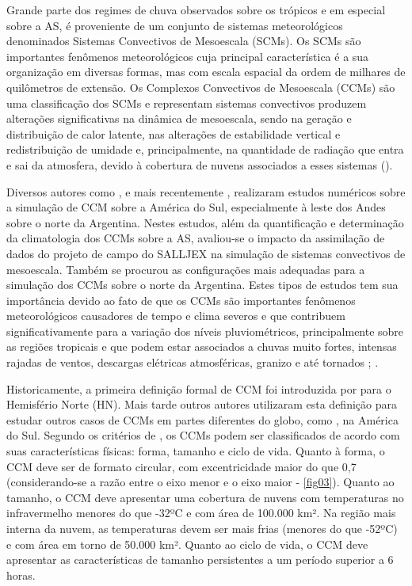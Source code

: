 Grande parte dos regimes de chuva observados sobre os trópicos e em especial sobre a AS, é proveniente de um conjunto de sistemas meteorológicos denominados Sistemas Convectivos de Mesoescala (SCMs). Os SCMs são importantes fenômenos meteorológicos cuja principal característica é a sua organização em diversas formas, mas com escala espacial da ordem de milhares de quilômetros de extensão. Os Complexos Convectivos de Mesoescala (CCMs) são uma classificação dos SCMs e representam sistemas convectivos produzem alterações significativas na dinâmica de mesoescala, sendo na geração e distribuição de calor latente, nas alterações de estabilidade vertical e redistribuição de umidade e, principalmente, na quantidade de radiação que entra e sai da atmosfera, devido à cobertura de nuvens associados a esses sistemas (\cite{velascofritsch87}).

Diversos autores como ,  e mais recentemente , realizaram estudos numéricos sobre a simulação de CCM sobre a América do Sul, especialmente à leste dos Andes sobre o norte da Argentina. Nestes estudos, além da quantificação e determinação da climatologia dos CCMs sobre a AS, avaliou-se o impacto da assimilação de dados do projeto de campo do SALLJEX na simulação de sistemas convectivos de mesoescala. Também  se procurou as configurações mais adequadas para a simulação dos CCMs sobre o norte da Argentina. Estes tipos de estudos tem sua importância devido ao fato de que os CCMs são importantes fenômenos meteorológicos causadores de tempo e clima severos e que contribuem significativamente para a variação dos níveis pluviométricos, principalmente sobre as regiões tropicais e que podem estar associados a chuvas muito fortes, intensas rajadas de ventos, descargas elétricas atmosféricas, granizo e até tornados \cite{maddox80}; \cite{menezessilvadias04}.

Historicamente, a primeira definição formal de CCM foi introduzida por  para o Hemisfério Norte (HN). Mais tarde outros autores utilizaram esta definição para estudar outros casos de CCMs em partes diferentes do globo, como , na América do Sul. Segundo os critérios de , os CCMs podem ser classificados de acordo com suas características físicas: forma, tamanho e ciclo de vida. Quanto à forma, o CCM deve ser de formato circular, com excentricidade maior do que 0,7 (considerando-se a razão entre o eixo menor e o eixo maior - \autoref{fig03}). Quanto ao tamanho, o CCM deve apresentar uma cobertura de nuvens com temperaturas no infravermelho menores do que -32ºC e com área de 100.000 km². Na região mais interna da nuvem, as temperaturas devem ser mais frias (menores do que -52ºC) e com área em torno de 50.000 km². Quanto ao ciclo de vida, o CCM deve apresentar as características de tamanho persistentes a um período superior a 6 horas.

